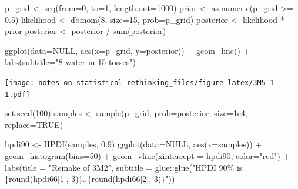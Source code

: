 \documentclass[
]{book}
\newenvironment{Shaded}{\begin{snugshade}}{\end{snugshade}}
\newcommand{\AttributeTok}[1]{\textcolor[rgb]{0.77,0.63,0.00}{#1}}
\newcommand{\ConstantTok}[1]{\textcolor[rgb]{0.00,0.00,0.00}{#1}}
\newcommand{\DecValTok}[1]{\textcolor[rgb]{0.00,0.00,0.81}{#1}}
\newcommand{\FloatTok}[1]{\textcolor[rgb]{0.00,0.00,0.81}{#1}}
\newcommand{\FunctionTok}[1]{\textcolor[rgb]{0.00,0.00,0.00}{#1}}
\newcommand{\NormalTok}[1]{#1}
\newcommand{\OtherTok}[1]{\textcolor[rgb]{0.56,0.35,0.01}{#1}}
\newcommand{\SpecialCharTok}[1]{\textcolor[rgb]{0.00,0.00,0.00}{#1}}
\newcommand{\StringTok}[1]{\textcolor[rgb]{0.31,0.60,0.02}{#1}}
\begin{document}
\begin{Shaded}
\begin{Highlighting}[]
\NormalTok{p\_grid }\OtherTok{\textless{}{-}} \FunctionTok{seq}\NormalTok{(}\AttributeTok{from=}\DecValTok{0}\NormalTok{, }\AttributeTok{to=}\DecValTok{1}\NormalTok{, }\AttributeTok{length.out=}\DecValTok{1000}\NormalTok{)}
\NormalTok{prior }\OtherTok{\textless{}{-}} \FunctionTok{as.numeric}\NormalTok{(p\_grid }\SpecialCharTok{\textgreater{}=} \FloatTok{0.5}\NormalTok{)}
\NormalTok{likelihood }\OtherTok{\textless{}{-}} \FunctionTok{dbinom}\NormalTok{(}\DecValTok{8}\NormalTok{, }\AttributeTok{size=}\DecValTok{15}\NormalTok{, }\AttributeTok{prob=}\NormalTok{p\_grid)}
\NormalTok{posterior }\OtherTok{\textless{}{-}}\NormalTok{ likelihood }\SpecialCharTok{*}\NormalTok{ prior}
\NormalTok{posterior }\OtherTok{\textless{}{-}}\NormalTok{ posterior }\SpecialCharTok{/} \FunctionTok{sum}\NormalTok{(posterior)}

\FunctionTok{ggplot}\NormalTok{(}\AttributeTok{data=}\ConstantTok{NULL}\NormalTok{, }\FunctionTok{aes}\NormalTok{(}\AttributeTok{x=}\NormalTok{p\_grid, }\AttributeTok{y=}\NormalTok{posterior)) }\SpecialCharTok{+} 
  \FunctionTok{geom\_line}\NormalTok{() }\SpecialCharTok{+}
  \FunctionTok{labs}\NormalTok{(}\AttributeTok{subtitle=}\StringTok{"8 water in 15 tosses"}\NormalTok{)}
\end{Highlighting}
\end{Shaded}

\texttt{[image: notes-on-statistical-rethinking\_files/figure-latex/3M5-1-1.pdf]}

\begin{Shaded}
\begin{Highlighting}[]
\FunctionTok{set.seed}\NormalTok{(}\DecValTok{100}\NormalTok{)}
\NormalTok{samples }\OtherTok{\textless{}{-}} \FunctionTok{sample}\NormalTok{(p\_grid, }\AttributeTok{prob=}\NormalTok{posterior, }\AttributeTok{size=}\FloatTok{1e4}\NormalTok{, }\AttributeTok{replace=}\ConstantTok{TRUE}\NormalTok{)}

\NormalTok{hpdi90 }\OtherTok{\textless{}{-}} \FunctionTok{HPDI}\NormalTok{(samples, }\FloatTok{0.9}\NormalTok{)}
\FunctionTok{ggplot}\NormalTok{(}\AttributeTok{data=}\ConstantTok{NULL}\NormalTok{, }\FunctionTok{aes}\NormalTok{(}\AttributeTok{x=}\NormalTok{samples)) }\SpecialCharTok{+} 
  \FunctionTok{geom\_histogram}\NormalTok{(}\AttributeTok{bins=}\DecValTok{50}\NormalTok{) }\SpecialCharTok{+} 
  \FunctionTok{geom\_vline}\NormalTok{(}\AttributeTok{xintercept =}\NormalTok{ hpdi90, }\AttributeTok{color=}\StringTok{"red"}\NormalTok{) }\SpecialCharTok{+} 
  \FunctionTok{labs}\NormalTok{(}\AttributeTok{title =} \StringTok{"Remake of 3M2"}\NormalTok{,}
       \AttributeTok{subtitle =}\NormalTok{ glue}\SpecialCharTok{::}\FunctionTok{glue}\NormalTok{(}\StringTok{"HPDI 90\% is \{round(hpdi66[1], 3)\}..\{round(hpdi66[2], 3)\}"}\NormalTok{))}
\end{Highlighting}
\end{Shaded}
\end{document}
